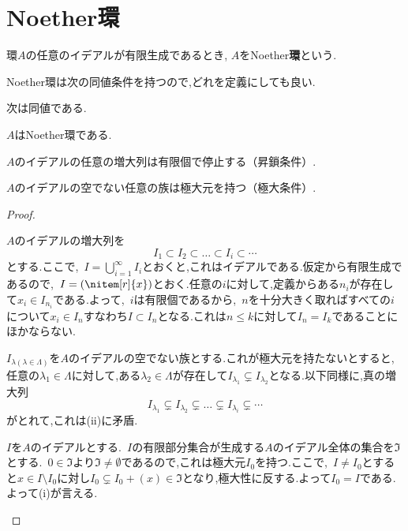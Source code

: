 \section{Noether環}

\begin{defi}[Noether環]\label{defi:Noether環}
		環$A$の任意のイデアルが有限生成であるとき, $A$をNoether\textbf{環}という.
\end{defi}
	
Noether環は次の同値条件を持つので,どれを定義にしても良い.

\begin{prop}
	次は同値である.
	\begin{sakura}
		\item $A$はNoether環である.
		\item $A$のイデアルの任意の増大列は有限個で停止する（昇鎖条件）.
		\item $A$のイデアルの空でない任意の族は極大元を持つ（極大条件）.
	\end{sakura}
\end{prop}
	
\begin{proof}
	\begin{eqv}[3]
		\item 
		$A$のイデアルの増大列を
		\[I_1\subset I_2\subset\dots\subset I_i\subset\cdots\]
		とする.ここで,~$I=\bigcup_{i=1}^\infty I_i$とおくと,これはイデアルである.仮定から有限生成であるので,~$I=(\nitem[r]{x})$とおく.任意の$i$に対して,定義からある$n_i$が存在して$x_i\in I_{n_i}$である.よって,~$i$は有限個であるから,~$n$を十分大きく取ればすべての$i$について$x_i\in I_n$すなわち$I\subset I_{n}$となる.これは$n\leq k$に対して$I_{n}=I_k$であることにほかならない.
		\item
		$I_{\lambda(\lambda\in\Lambda)}$を$A$のイデアルの空でない族とする.これが極大元を持たないとすると,任意の$\lambda_1\in\Lambda$に対して,ある$\lambda_2\in\Lambda$が存在して$I_{\lambda_1}\subsetneq I_{\lambda_2}$となる.以下同様に,真の増大列
		\[I_{\lambda_1}\subsetneq I_{\lambda_2}\subsetneq\dots\subsetneq I_{\lambda_i}\subsetneq\cdots\]
		がとれて,これは(ii)に矛盾.
		\item 
		$I$を$A$のイデアルとする.~$I$の有限部分集合が生成する$A$のイデアル全体の集合を$\Im$とする.~$0\in\Im$より$\Im\neq\emptyset$であるので,これは極大元$I_0$を持つ.ここで,~$I\neq I_0$とすると$x\in I\setminus I_0$に対し$I_0\subsetneq I_0+(x)\in\Im$となり,極大性に反する.よって$I_0=I$である.よって(i)が言える.
	\end{eqv}
\end{proof}

